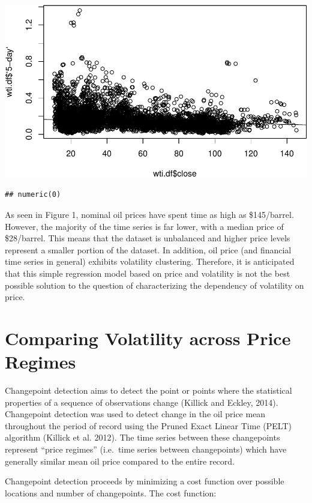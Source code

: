 \documentclass[11pt,]{article}
\makeatletter
\def\maxwidth{\ifdim\Gin@nat@width>\linewidth\linewidth
\else\Gin@nat@width\fi}
\let\Oldincludegraphics\includegraphics
\renewcommand{\includegraphics}[1]{\Oldincludegraphics[width=\maxwidth]{#1}}
\makeatother
\begin{document}
\includegraphics{JHamski_manuscript_files/figure-latex/unnamed-chunk-9-3.pdf}

\begin{verbatim}
## numeric(0)
\end{verbatim}

As seen in Figure 1, nominal oil prices have spent time as high as
\$145/barrel. However, the majority of the time series is far lower,
with a median price of \$28/barrel. This means that the dataset is
unbalanced and higher price levels represent a smaller portion of the
dataset. In addition, oil price (and financial time series in general)
exhibits volatility clustering. Therefore, it is anticipated that this
simple regression model based on price and volatility is not the best
possible solution to the question of characterizing the dependency of
volatility on price.

\section{Comparing Volatility across Price
Regimes}\label{comparing-volatility-across-price-regimes}

Changepoint detection aims to detect the point or points where the
statistical properties of a sequence of observations change (Killick and
Eckley, 2014). Changepoint detection was used to detect change in the
oil price mean throughout the period of record using the Pruned Exact
Linear Time (PELT) algorithm (Killick et al. 2012). The time series
between these changepoints represent ``price regimes'' (i.e.~time series
between changepoints) which have generally similar mean oil price
compared to the entire record.

Changepoint detection proceeds by minimizing a cost function over
possible locations and number of changepoints. The cost function:
\newpage
\singlespacing

\end{document}
